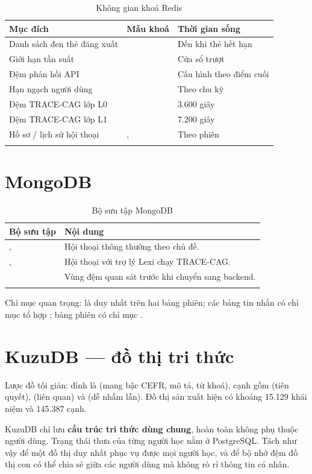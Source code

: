 \begin{longtable}{L{4.6cm} L{4.4cm} L{4.2cm}}
\toprule
\textbf{Mục đích} & \textbf{Mẫu khoá} & \textbf{Thời gian sống}\\
\midrule
\endhead
Danh sách đen thẻ đăng xuất &  & Đến khi thẻ hết hạn\\
Giới hạn tần suất &  & Cửa sổ trượt\\
Đệm phản hồi API &  & Cấu hình theo điểm cuối\\
Hạn ngạch người dùng &  & Theo chu kỳ\\
Đệm TRACE-CAG lớp L0 &  & 3.600 giây\\
Đệm TRACE-CAG lớp L1 &  & 7.200 giây\\
Hồ sơ / lịch sử hội thoại & ,  & Theo phiên\\
\bottomrule
\caption{Không gian khoá Redis}
\end{longtable}

\section{MongoDB}

\begin{longtable}{L{5.4cm} L{8.2cm}}
\toprule
\textbf{Bộ sưu tập} & \textbf{Nội dung}\\
\midrule
\endhead
{},  & Hội thoại thông thường theo chủ đề.\\
,  & Hội thoại với trợ lý Lexi chạy TRACE-CAG.\\
 & Vùng đệm quan sát trước khi chuyển sang backend.\\
\bottomrule
\caption{Bộ sưu tập MongoDB}
\end{longtable}

Chỉ mục quan trọng:  là duy nhất trên hai bảng phiên; các bảng tin nhắn
có chỉ mục tổ hợp ; bảng phiên có chỉ mục
.

\section{KuzuDB — đồ thị tri thức}

Lược đồ tối giản: đỉnh là  (mang bậc CEFR, mô tả, từ khoá), cạnh gồm
 (tiên quyết),  (liên quan) và
 (dễ nhầm lẫn). Đồ thị sản xuất hiện có khoảng 15.129 khái niệm và
145.387 cạnh.

\begin{luuy}
KuzuDB chỉ lưu \textbf{cấu trúc tri thức dùng chung}, hoàn toàn không phụ thuộc người
dùng. Trạng thái thưa của từng người học nằm ở PostgreSQL. Tách như vậy để một đồ thị
duy nhất phục vụ được mọi người học, và để bộ nhớ đệm đồ thị con có thể chia sẻ giữa các
người dùng mà không rò rỉ thông tin cá nhân.
\end{luuy}
